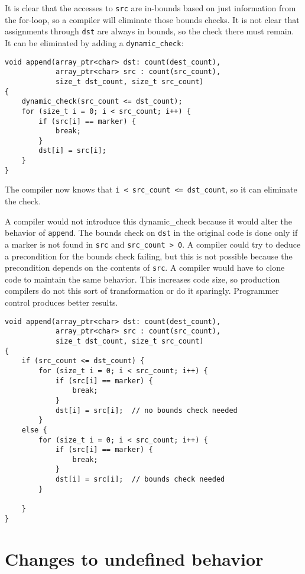 It is clear that the accesses to \texttt{src} are in-bounds based on
just information from the for-loop, so a compiler will eliminate those
bounds checks. It is not clear that assignments through \texttt{dst} are
always in bounds, so the check there must remain. It can be eliminated
by adding a \texttt{dynamic\_check}:

\begin{verbatim}
void append(array_ptr<char> dst: count(dest_count), 
            array_ptr<char> src : count(src_count), 
            size_t dst_count, size_t src_count)
{ 
    dynamic_check(src_count <= dst_count);
    for (size_t i = 0; i < src_count; i++) {
        if (src[i] == marker) {
            break;
        }
        dst[i] = src[i];
    }
}
\end{verbatim}

The compiler now knows that \texttt{i \textless{} src\_count
\textless{}= dst\_count}, so it can eliminate the check.

A compiler would not introduce this dynamic\_check because it would
alter the behavior of \texttt{append}. The bounds check on \texttt{dst}
in the original code is done only if a marker is not found in
\texttt{src} and \texttt{src\_count \textgreater{} 0}. A compiler could
try to deduce a precondition for the bounds check failing, but this is
not possible because the precondition depends on the contents of
\texttt{src}. A compiler would have to clone code to maintain the same
behavior. This increases code size, so production compilers do not this
sort of transformation or do it sparingly. Programmer control produces
better results.

\begin{verbatim}
void append(array_ptr<char> dst: count(dest_count), 
            array_ptr<char> src : count(src_count), 
            size_t dst_count, size_t src_count)
{ 
    if (src_count <= dst_count) {
        for (size_t i = 0; i < src_count; i++) {
            if (src[i] == marker) {
                break;
            }
            dst[i] = src[i];  // no bounds check needed
        }   
    else {
        for (size_t i = 0; i < src_count; i++) {
            if (src[i] == marker) {
                break;
            }
            dst[i] = src[i];  // bounds check needed
        }   

    }
}
\end{verbatim}

\section{Changes to undefined behavior}
\label{section:changes-to-undefined-behavior}


